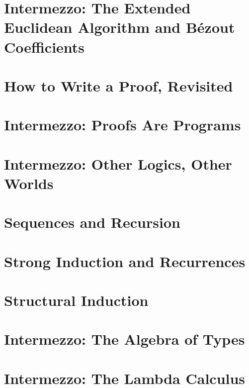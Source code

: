 \documentclass[11pt]{report}
\begin{document}
\chapter*{Intermezzo: The Extended Euclidean Algorithm and B\'ezout Coefficients}


\chapter*{How to Write a Proof, Revisited}


\chapter*{Intermezzo: Proofs Are Programs}


\chapter*{Intermezzo: Other Logics, Other Worlds}


\chapter{Sequences and Recursion}


\chapter{Strong Induction and Recurrences}


\chapter{Structural Induction}


\chapter*{Intermezzo: The Algebra of Types}


\chapter*{Intermezzo: The Lambda Calculus}

\end{document}
